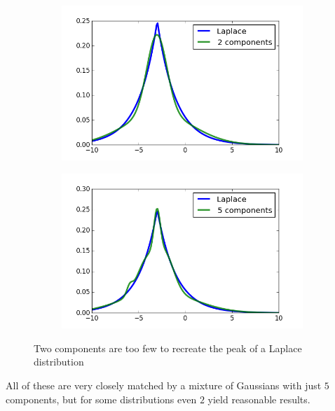 \documentclass[11pt,a4paper]{book}
\begin{document}
\begin{figure}[h]
  \centering
  \begin{subfigure}{0.45\textwidth}
    \centering
    \includegraphics[width=\textwidth]{thesis/em/laplace-2-components}
  \end{subfigure}
  \hfill
  \begin{subfigure}{0.45\textwidth}
    \centering
    \includegraphics[width=\textwidth]{thesis/em/laplace-5-components}
  \end{subfigure}
  \caption{Two components are too few to recreate the peak of a Laplace
    distribution}
  \label{fig:em-laplace}
\end{figure}
All of these are very closely matched by a mixture of Gaussians with just $5$
components, but for some distributions even $2$ yield reasonable results.
\end{document}
